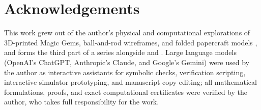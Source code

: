 \section*{Acknowledgements}
\label{sec:ai_statement}

This work grew out of the author's physical and computational explorations of 3D-printed Magic Gems, ball-and-rod wireframes, and folded papercraft models \citep{mathewson2025magicgemweb}, and forms the third part of a series alongside \citet{mathewson2026moments} and \citet{mathewson2026gems}. Large language models (OpenAI's ChatGPT, Anthropic's Claude, and Google's Gemini) were used by the author as interactive assistants for symbolic checks, verification scripting, interactive simulator prototyping, and manuscript copy-editing; all mathematical formulations, proofs, and exact computational certificates were verified by the author, who takes full responsibility for the work.
